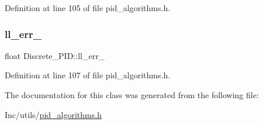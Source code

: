 Definition at line 105 of file pid\+\_\+algorithms.\+h.

\mbox{\label{class_discrete___p_i_d_aeacdfd2929599c6217f8cd06df89eb21}} 
\subsubsection{\texorpdfstring{ll\_err\_}{ll\_err\_}}
{\footnotesize\ttfamily float Discrete\+\_\+\+P\+I\+D\+::ll\+\_\+err\+\_\+\hspace{0.3cm}{\ttfamily [private]}}



Definition at line 107 of file pid\+\_\+algorithms.\+h.



The documentation for this class was generated from the following file\+:\begin{DoxyCompactItemize}
\item 
Inc/utils/\mbox{\hyperlink{pid__algorithms_8h}{pid\+\_\+algorithms.\+h}}\end{DoxyCompactItemize}
